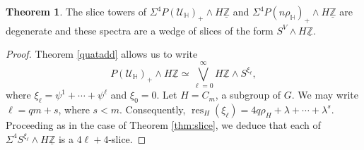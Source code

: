 \documentclass[a4paper,leqno,11pt]{amsart}
\theoremstyle{plain}
\theoremstyle{definition}
\newtheorem{thm}[theorem]{Theorem}
\theoremstyle{remark}
\theoremstyle{definition}
\newcommand{\res}{\mathit{res}}
\newcommand{\uZ}{\underline{\mathbb{Z}}}
\numberwithin{equation}{section}
\newcommand{\smas}{\wedge}
\newcommand{\bigwedg}{\bigvee}
\newcommand{\bH}{{\mathbb H}}
\renewcommand{\res}{\operatorname{res}}
\begin{document}
	\begin{thm}\label{thm:slicequa}
		The slice towers of $ \Sigma^4 P(\mathcal{U}_\bH)_+\smas H\uZ $ and $ \Sigma^4 P(n\rho_\bH)_+\smas H\uZ $ are degenerate and these spectra are a wedge of slices of the form $ S^V\smas H\uZ $.
	\end{thm}
	\begin{proof}
		Theorem \ref{quatadd} allows us to write  \[ P(\mathcal{U}_\bH)_+\smas H\uZ \simeq \bigwedg_{\ell=0}^\infty H\uZ\smas S^{\xi_\ell},\]
		where  $ \xi_\ell=\psi^1+\cdots+\psi^{\ell} $ and $ \xi_0=0 $. 
		Let $ H=C_m $, a subgroup of $ G $. We may write $ \ell  =qm +s$, where $ s<m $. Consequently, $ \res_H(\xi_\ell)=4q\rho_H+\lambda +\cdots +\lambda^s$. Proceeding  as in the case of Theorem \ref{thm:slice}, we  deduce that each of $ \Sigma^4S^{\xi_\ell}\smas H\uZ $ is a $ 4\ell+4 $-slice.
	\end{proof}
	
\end{document}
